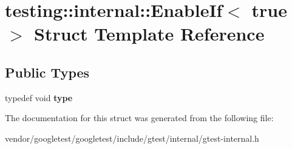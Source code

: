 \hypertarget{structtesting_1_1internal_1_1EnableIf_3_01true_01_4}{}\section{testing\+:\+:internal\+:\+:Enable\+If$<$ true $>$ Struct Template Reference}
\label{structtesting_1_1internal_1_1EnableIf_3_01true_01_4}
\subsection*{Public Types}
\begin{DoxyCompactItemize}
\item 
typedef void {\bfseries type}\hypertarget{structtesting_1_1internal_1_1EnableIf_3_01true_01_4_a9398d803f1fdd99ff41823746f6299ff}{}\label{structtesting_1_1internal_1_1EnableIf_3_01true_01_4_a9398d803f1fdd99ff41823746f6299ff}

\end{DoxyCompactItemize}


The documentation for this struct was generated from the following file\+:\begin{DoxyCompactItemize}
\item 
vendor/googletest/googletest/include/gtest/internal/gtest-\/internal.\+h\end{DoxyCompactItemize}
